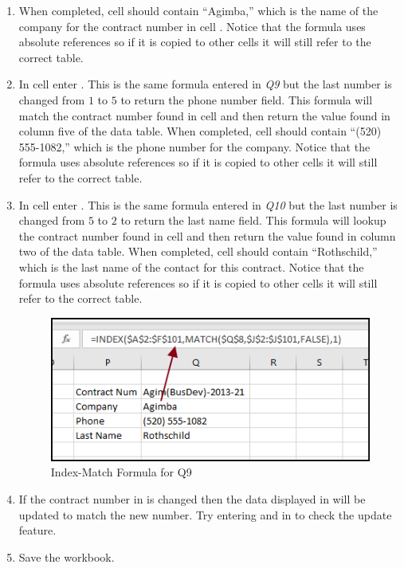 \begin{enumerate}
	\item When completed, cell  should contain ``Agimba,'' which is the name of the company for the contract number in cell . Notice that the formula uses absolute references so if it is copied to other cells it will still refer to the correct table.
	\item In cell  enter . This is the same formula entered in \textit{Q9} but the last number is changed from $ 1 $ to $ 5 $ to return the phone number field. This formula will match the contract number found in cell  and then return the value found in column five of the data table. When completed, cell  should contain ``(520) 555-1082,'' which is the phone number for the company.  Notice that the formula uses absolute references so if it is copied to other cells it will still refer to the correct table. 
	\item In cell  enter . This is the same formula entered in \textit{Q10} but the last number is changed from $ 5 $ to $ 2 $ to return the last name field. This formula will lookup the contract number found in cell  and then return the value found in column two of the data table. When completed, cell  should contain ``Rothschild,'' which is the last name of the contact for this contract.  Notice that the formula uses absolute references so if it is copied to other cells it will still refer to the correct table. 
	
	\begin{figure}[H]
		\centering
		\includegraphics[width=\maxwidth{.95\linewidth}]{gfx/ch09_fig37}
		\caption{Index-Match Formula for Q9}
		\label{09:fig37}
	\end{figure}
	
	\item If the contract number in  is changed then the data displayed in  will be updated to match the new number. Try entering  and  in  to check the update feature.
	\item Save the  workbook.
		
\end{enumerate}

